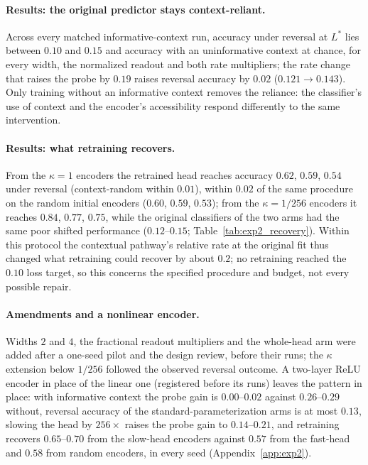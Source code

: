 \paragraph{Results: the original predictor stays context-reliant.}
Across every matched informative-context run, accuracy under reversal at
$L^\ast$ lies between $0.10$ and $0.15$ and accuracy with an uninformative
context at chance, for every width, the normalized readout and both rate
multipliers; the rate change that raises the probe by $0.19$ raises
reversal accuracy by $0.02$ ($0.121\to0.143$). Only training without an
informative context removes the reliance: the classifier's use of context
and the encoder's accessibility respond differently to the same
intervention.

\paragraph{Results: what retraining recovers.}
From the $\kappa=1$ encoders the retrained head reaches accuracy $0.62$,
$0.59$, $0.54$ under reversal (context-random within $0.01$), within
$0.02$ of the same procedure on the random initial encoders ($0.60$,
$0.59$, $0.53$); from the $\kappa=1/256$ encoders it reaches $0.84$,
$0.77$, $0.75$, while the original classifiers of the two arms had the
same poor shifted performance ($0.12$--$0.15$;
Table~\ref{tab:exp2_recovery}). Within this
protocol the contextual pathway's relative rate at the original fit thus
changed what retraining could recover by about $0.2$; no retraining
reached the $0.10$ loss target, so this concerns the specified procedure
and budget, not every possible repair.

\paragraph{Amendments and a nonlinear encoder.}
Widths $2$ and $4$, the fractional readout multipliers and the whole-head
arm were added after a one-seed pilot and the design review, before their
runs; the $\kappa$ extension below $1/256$ followed the observed reversal
outcome. A two-layer ReLU encoder in place of the
linear one (registered before its runs) leaves the pattern in place: with
informative context the probe gain is $0.00$--$0.02$ against
$0.26$--$0.29$ without, reversal accuracy of the standard-parameterization
arms is at most $0.13$, slowing the head by $256\times$ raises the probe
gain to $0.14$--$0.21$, and retraining recovers $0.65$--$0.70$ from the
slow-head encoders against $0.57$ from the fast-head and $0.58$ from
random encoders, in every seed (Appendix~\ref{app:exp2}).

